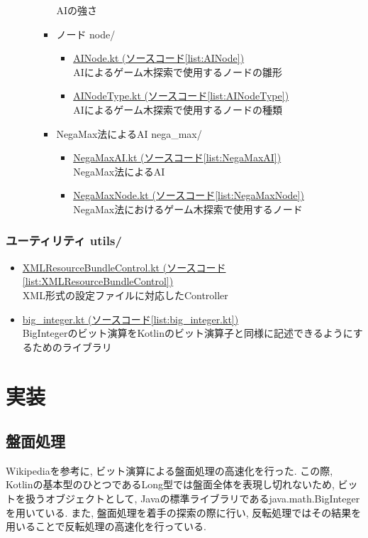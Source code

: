 \documentclass[uplatex,titlepage]{jsarticle}
\begin{document}
\begin{itemize}
\begin{itemize}
\begin{itemize}
AIの強さ
\item ノード node/
\begin{itemize}
\item \underline{AINode.kt (ソースコード\ref{list:AINode})}\\
AIによるゲーム木探索で使用するノードの雛形
\item \underline{AINodeType.kt (ソースコード\ref{list:AINodeType})}\\
AIによるゲーム木探索で使用するノードの種類
\end{itemize}
\item NegaMax法によるAI nega\_max/
\begin{itemize}
\item \underline{NegaMaxAI.kt (ソースコード\ref{list:NegaMaxAI})}\\
NegaMax法によるAI
\item \underline{NegaMaxNode.kt (ソースコード\ref{list:NegaMaxNode})}\\
NegaMax法におけるゲーム木探索で使用するノード
\end{itemize}
\end{itemize}
\end{itemize}
\end{itemize}

\subsubsection{ユーティリティ utils/}
\begin{itemize}
\item \underline{XMLResourceBundleControl.kt (ソースコード\ref{list:XMLResourceBundleControl})}\\
XML形式の設定ファイルに対応したController
\item \underline{big\_integer.kt (ソースコード\ref{list:big_integer.kt})}\\
BigIntegerのビット演算をKotlinのビット演算子と同様に記述できるようにするためのライブラリ
\end{itemize}

\section{実装}
\subsection{盤面処理}
Wikipedia\cite{wikipedia}を参考に, ビット演算による盤面処理の高速化を行った. この際, Kotlinの基本型のひとつであるLong型では盤面全体を表現し切れないため, ビットを扱うオブジェクトとして, Javaの標準ライブラリであるjava.math.BigIntegerを用いている. また, 盤面処理を着手の探索の際に行い, 反転処理ではその結果を用いることで反転処理の高速化を行っている.
\end{document}

